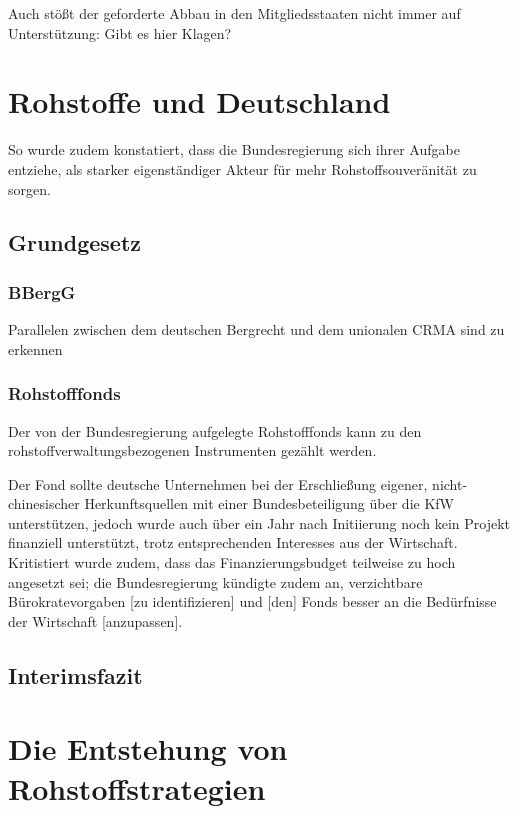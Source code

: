 \documentclass[12pt,a4paper,oneside]{book} %
\begin{document}
Auch stößt der geforderte Abbau in den Mitgliedsstaaten nicht immer auf Unterstützung: Gibt es hier Klagen?

\section{Rohstoffe und Deutschland}



So wurde zudem konstatiert, dass die Bundesregierung sich ihrer Aufgabe entziehe, \glqq  als starker eigenständiger Akteur für mehr Rohstoffsouveränität zu sorgen\grqq.\autocite{Wirtschaft fordert mehr Tempo bei Rohstofffonds}

\subsection{Grundgesetz}

\subsubsection{BBergG}
Parallelen zwischen dem deutschen Bergrecht und dem unionalen CRMA sind zu erkennen

\subsubsection{Rohstofffonds}
Der von der Bundesregierung aufgelegte Rohstofffonds kann zu den rohstoffverwaltungsbezogenen Instrumenten gezählt werden.

Der Fond sollte deutsche Unternehmen bei der Erschließung eigener, nicht-chinesischer Herkunftsquellen mit einer Bundesbeteiligung über die KfW unterstützen, jedoch wurde auch über ein Jahr nach Initiierung noch kein Projekt finanziell unterstützt, trotz entsprechenden Interesses aus der Wirtschaft. Kritistiert wurde zudem, dass das Finanzierungsbudget teilweise zu hoch angesetzt sei; die Bundesregierung kündigte zudem an, \glqq verzichtbare Bürokratevorgaben [zu identifizieren] und [den] Fonds besser an die Bedürfnisse der Wirtschaft [anzupassen]\grqq.\autocite{Wirtschaft fordert mehr Tempo bei Rohstofffonds}

\subsection{Interimsfazit}

\section{Die Entstehung von Rohstoffstrategien}
\end{document}
